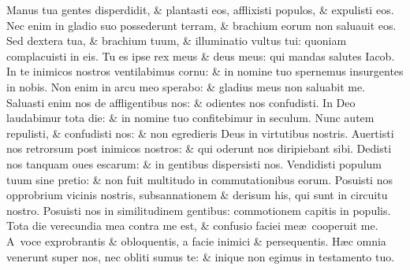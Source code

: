 \documentclass[a5paper,10pt]{book}
\def\ae{æ}
\begin{document}
\begin{multicols*}{2}
\newline \color{red} M\color{black}anus tua gentes disperdidit, \& plantasti eos, afflixisti populos, \& expulisti eos.
\newline \color{red} N\color{black}ec enim in gladio suo possederunt terram, \& brachium eorum non saluauit eos.
\newline \color{red} S\color{black}ed dextera tua, \& brachium tuum, \& illuminatio vultus tui: quoniam complacuisti in eis.
\newline \color{red} T\color{black}u es ipse rex meus \& deus meus: qui mandas salutes Iacob.
\newline \color{red} I\color{black}n te inimicos nostros ventilabimus cornu: \& in nomine tuo spernemus insurgentes in nobis.
\newline \color{red} N\color{black}on enim in arcu meo sperabo: \& gladius meus non saluabit me.
\newline \color{red} S\color{black}aluasti enim nos de affligentibus nos: \& odientes nos confudisti.
\newline \color{red} I\color{black}n Deo laudabimur tota die: \& in nomine tuo confitebimur in seculum.
\newline \color{red} N\color{black}unc autem repulisti, \& confudisti nos: \& non egredieris Deus in virtutibus nostris.
\newline \color{red} A\color{black}uertisti nos retrorsum post inimicos nostros: \& qui oderunt nos diripiebant sibi.
\newline \color{red} D\color{black}edisti nos tanquam oues escarum: \& in gentibus dispersisti nos.
\newline \color{red} V\color{black}endidisti populum tuum sine pretio: \& non fuit multitudo in commutationibus eorum.
\newline \color{red} P\color{black}osuisti nos opprobrium vicinis nostris, subsannationem \& derisum his, qui sunt in circuitu nostro.
\newline \color{red} P\color{black}osuisti nos in similitudinem gentibus: commotionem capitis in populis.
\newline \color{red} T\color{black}ota die verecundia mea contra me est, \& confusio faciei me\ae \ cooperuit me.
\newline \color{red} A\color{black}\ voce exprobrantis \& obloquentis, a facie inimici \& persequentis.
\newline \color{red} H\color{black}\ae c omnia venerunt super nos, nec obliti sumus te: \& inique non egimus in testamento tuo.

\end{multicols*}
\end{document}
